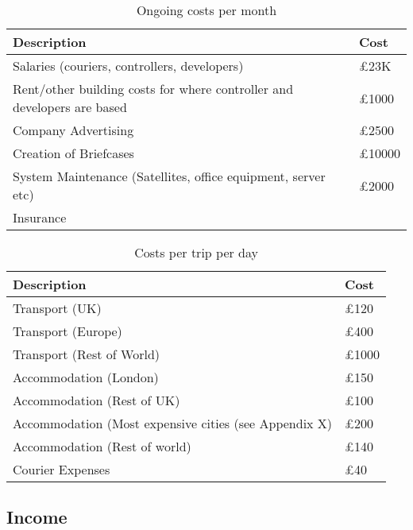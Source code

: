 \begin{table}[H]
    \centering
    \begin{tabular}{|p{}|p{}|}
        \hline
        \textbf{Description} & \textbf{Cost} \\
        \hline
        Salaries (couriers, controllers, developers) & £23K\\
        \hline
        Rent/other building costs for where controller and developers are based & £1000\\
        \hline
        Company Advertising & £2500\\
        \hline
        Creation of Briefcases & £10000\\
        \hline
        System Maintenance (Satellites, office equipment, server etc) & £2000\\
        \hline
        Insurance & \\
        \hline
    \end{tabular}
    \caption{Ongoing costs per month}
    \label{tab:ongoingCosts}
\end{table}

\begin{table}[H]
    \centering
    \begin{tabular}{|p{}|p{}|}
        \hline
        \textbf{Description} & \textbf{Cost} \\
        \hline
        Transport (UK) & £120\\
        \hline
        Transport (Europe) & £400\\
        \hline
        Transport (Rest of World) & £1000 \\
        \hline
        Accommodation (London) & £150\\
        \hline
        Accommodation (Rest of UK) & £100\\
        \hline
        Accommodation (Most expensive cities (see Appendix X) & £200\\
        \hline
        Accommodation (Rest of world) & £140\\
        \hline
        Courier Expenses & £40\\
        \hline
    \end{tabular}
    \caption{Costs per trip per day}
    \label{tab:tripCosts}
\end{table}

\subsection{Income}

